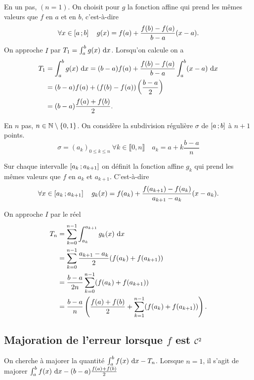 En un pas, $(n=1)$. On choisit pour $g$ la fonction affine qui prend les mêmes valeurs que $f$ en $a$ et en $b$, c'est-à-dire
\begin{equation}
  \forall x \in \left[ a \, ;  b \right] \quad g(x) = f(a) +\frac{f(b)-f(a)}{b-a}(x-a).
\end{equation}
On approche $I$ par $T_1=\int_a^bg(x)\,\mathop{}\mathopen{}\mathrm{d} x$. Lorsqu'on calcule on a
\begin{align}
  T_1&=\int_a^bg(x)\,\mathop{}\mathopen{}\mathrm{d} x = (b-a)f(a) + \frac{f(b)-f(a)}{b-a} \int_a^b (x-a)\,\mathop{}\mathopen{}\mathrm{d} x \\
  &=(b-a)f(a) + (f(b)-f(a))\left(\frac{b-a}{2}\right)\\
  &=(b-a) \frac{f(a)+f(b)}{2}.
\end{align}

En $n$ pas, $n \in \mathbb{N}\setminus\{0,1\}$. On considère la subdivision régulière $\sigma$ de $\left[ a \, ;  b \right]$ à $n+1$ points.
\begin{equation}
  \sigma = (a_k)_{0 \leqslant k \leqslant n} \ \forall k \in \llbracket 0,n \rrbracket \quad a_k = a+ k \frac{b-a}{n}
\end{equation}

Sur chaque intervalle $\left[ a_k \, ;  a_{k+1} \right]$ on définit la fonction affine $g_k$ qui prend les mêmes valeurs que $f$ en $a_k$ et $a_{k+1}$. C'est-à-dire
\begin{equation}
  \forall x \in \left[ a_k \, ;  a_{k+1} \right] \quad g_k(x) = f(a_k) + \frac{f(a_{k+1})-f(a_k)}{a_{k+1}-a_k}(x-a_{k}).
\end{equation}

On approche $I$ par le réel
\begin{align}
  T_n &= \sum_{k=0}^{n-1} \int_{a_k}^{a_{k+1}} g_k(x)\,\mathop{}\mathopen{}\mathrm{d} x \\
  &= \sum_{k=0}^{n-1} \frac{a_{k+1}-a_k}{2}(f(a_k)+f(a_{k+1}))\\
  &=\frac{b-a}{2n}  \sum_{k=0}^{n-1}(f(a_k)+f(a_{k+1})) \\
  &=\frac{b-a}{n} \left(\frac{f(a)+f(b)}{2} + \sum_{k=1}^{n-1}(f(a_k)+f(a_{k+1})) \right).
\end{align}

\subsection{Majoration de l'erreur lorsque $f$ est $\mathcal{C}^{2}$}

On cherche à majorer la quantité $\int_a^bf(x)\,\mathop{}\mathopen{}\mathrm{d} x -T_n$. Lorsque $n=1$, il s'agit de majorer $\int_a^bf(x)\,\mathop{}\mathopen{}\mathrm{d} x - (b-a)\frac{f(a)+f(b)}{2}$

